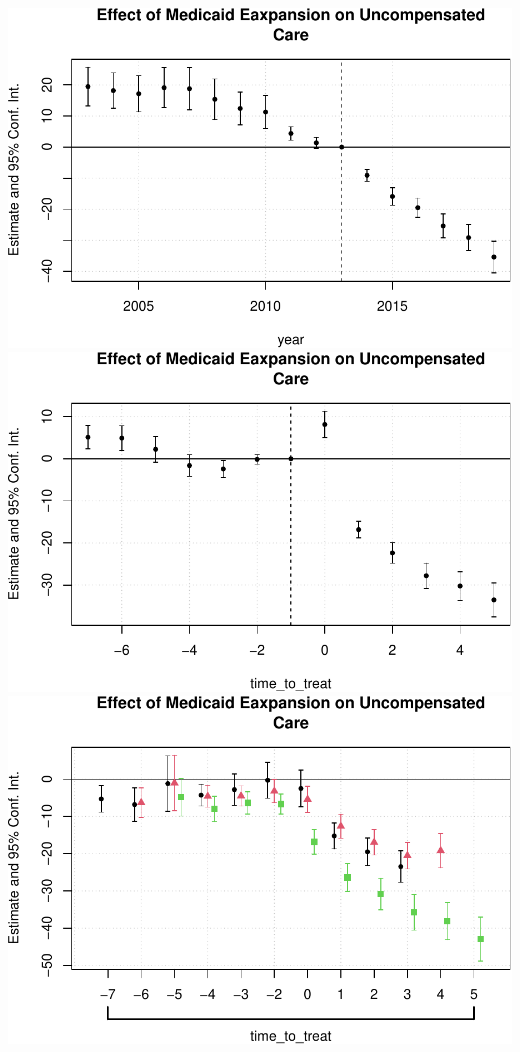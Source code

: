 \documentclass[
]{article}
\begin{document}
\includegraphics{Report_files/figure-latex/Figures-4.pdf}
\includegraphics{Report_files/figure-latex/Figures-5.pdf}
\includegraphics{Report_files/figure-latex/Figures-6.pdf}
\end{document}
